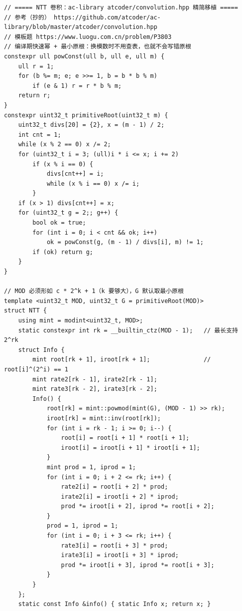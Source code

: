 		\begin{verbatim}
// ===== NTT 卷积：ac-library atcoder/convolution.hpp 精简移植 =====
// 参考（抄的） https://github.com/atcoder/ac-library/blob/master/atcoder/convolution.hpp
// 模板题 https://www.luogu.com.cn/problem/P3803
// 编译期快速幂 + 最小原根：换模数时不用查表，也就不会写错原根
constexpr ull powConst(ull b, ull e, ull m) {
    ull r = 1;
    for (b %= m; e; e >>= 1, b = b * b % m)
        if (e & 1) r = r * b % m;
    return r;
}
constexpr uint32_t primitiveRoot(uint32_t m) {
    uint32_t divs[20] = {2}, x = (m - 1) / 2;
    int cnt = 1;
    while (x % 2 == 0) x /= 2;
    for (uint32_t i = 3; (ull)i * i <= x; i += 2)
        if (x % i == 0) {
            divs[cnt++] = i;
            while (x % i == 0) x /= i;
        }
    if (x > 1) divs[cnt++] = x;
    for (uint32_t g = 2;; g++) {
        bool ok = true;
        for (int i = 0; i < cnt && ok; i++)
            ok = powConst(g, (m - 1) / divs[i], m) != 1;
        if (ok) return g;
    }
}

// MOD 必须形如 c * 2^k + 1（k 要够大），G 默认取最小原根
template <uint32_t MOD, uint32_t G = primitiveRoot(MOD)>
struct NTT {
    using mint = modint<uint32_t, MOD>;
    static constexpr int rk = __builtin_ctz(MOD - 1);   // 最长支持 2^rk
    struct Info {
        mint root[rk + 1], iroot[rk + 1];               // root[i]^(2^i) == 1
        mint rate2[rk - 1], irate2[rk - 1];
        mint rate3[rk - 2], irate3[rk - 2];
        Info() {
            root[rk] = mint::powmod(mint(G), (MOD - 1) >> rk);
            iroot[rk] = mint::inv(root[rk]);
            for (int i = rk - 1; i >= 0; i--) {
                root[i] = root[i + 1] * root[i + 1];
                iroot[i] = iroot[i + 1] * iroot[i + 1];
            }
            mint prod = 1, iprod = 1;
            for (int i = 0; i + 2 <= rk; i++) {
                rate2[i] = root[i + 2] * prod;
                irate2[i] = iroot[i + 2] * iprod;
                prod *= iroot[i + 2], iprod *= root[i + 2];
            }
            prod = 1, iprod = 1;
            for (int i = 0; i + 3 <= rk; i++) {
                rate3[i] = root[i + 3] * prod;
                irate3[i] = iroot[i + 3] * iprod;
                prod *= iroot[i + 3], iprod *= root[i + 3];
            }
        }
    };
    static const Info &info() { static Info x; return x; }


\end{verbatim}
